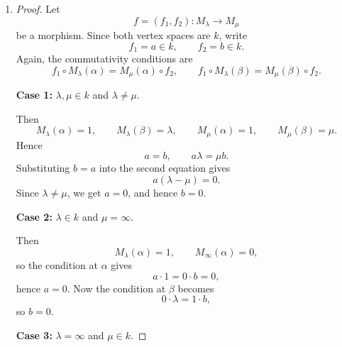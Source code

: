 \documentclass[12pt]{amsart}
\begin{document}
\begin{enumerate}
\begin{enumerate}[label=(\alph*)]
\begin{proof}
    \textbf{Case 2:} $\lambda\in k$ and $\mu=\infty$.

    Then
    \[
    M_\lambda(\alpha)=1,\qquad M_\infty(\alpha)=0.
    \]
    So commutativity at $\alpha$ gives
    \[
    a\cdot 1 = 0\cdot b = 0,
    \]
    hence $a=0$, contradicting the fact that $f_1$ is invertible.

    \textbf{Case 3:} $\lambda=\infty$ and $\mu\in k$.

    Then
    \[
    M_\infty(\alpha)=0,\qquad M_\mu(\alpha)=1.
    \]
    So commutativity at $\alpha$ gives
    \[
    a\cdot 0 = 1\cdot b,
    \]
    hence $b=0$, contradicting the fact that $f_2$ is invertible.

    Thus the only possible case is $\lambda=\mu$. Therefore
    \[
    M_\lambda\cong M_\mu \iff \lambda=\mu.
    \]

    In particular, the family $\{M_\lambda\}_{\lambda\in k\cup\{\infty\}}$ contains
    $|k|+1$ pairwise non-isomorphic indecomposable representations, so the number of
    indecomposable representations depends on the field $k$.
    \end{proof}

    \item
    \begin{proof}
    Let
    \[
    f=(f_1,f_2)\colon M_\lambda\to M_\mu
    \]
    be a morphism. Since both vertex spaces are $k$, write
    \[
    f_1=a\in k,\qquad f_2=b\in k.
    \]
    Again, the commutativity conditions are
    \[
    f_1\circ M_\lambda(\alpha)=M_\mu(\alpha)\circ f_2,
    \qquad
    f_1\circ M_\lambda(\beta)=M_\mu(\beta)\circ f_2.
    \]

    \textbf{Case 1:} $\lambda,\mu\in k$ and $\lambda\neq\mu$.

    Then
    \[
    M_\lambda(\alpha)=1,\qquad M_\lambda(\beta)=\lambda,
    \qquad
    M_\mu(\alpha)=1,\qquad M_\mu(\beta)=\mu.
    \]
    Hence
    \[
    a=b,\qquad a\lambda=\mu b.
    \]
    Substituting $b=a$ into the second equation gives
    \[
    a(\lambda-\mu)=0.
    \]
    Since $\lambda\neq\mu$, we get $a=0$, and hence $b=0$.

    \textbf{Case 2:} $\lambda\in k$ and $\mu=\infty$.

    Then
    \[
    M_\lambda(\alpha)=1,\qquad M_\infty(\alpha)=0,
    \]
    so the condition at $\alpha$ gives
    \[
    a\cdot 1 = 0\cdot b = 0,
    \]
    hence $a=0$. Now the condition at $\beta$ becomes
    \[
    0\cdot \lambda = 1\cdot b,
    \]
    so $b=0$.

    \textbf{Case 3:} $\lambda=\infty$ and $\mu\in k$.


\end{proof}
\end{enumerate}
\end{enumerate}
\end{document}
